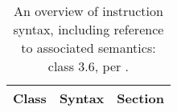 \begin{table}[!ht]
\begin{center}
\begin{tabular}{|c|l|l|}
\hline                                                                             
Class                 & Syntax                          & Section                                    \\
\hline\hline                                                                         
\hline                                                                             
\end{tabular}
\end{center}
\caption{An overview of instruction syntax, including reference to associated semantics: class $3.6$, per .}
\label{tab:instr_syntax:3:6}
\end{table}                                                                      

